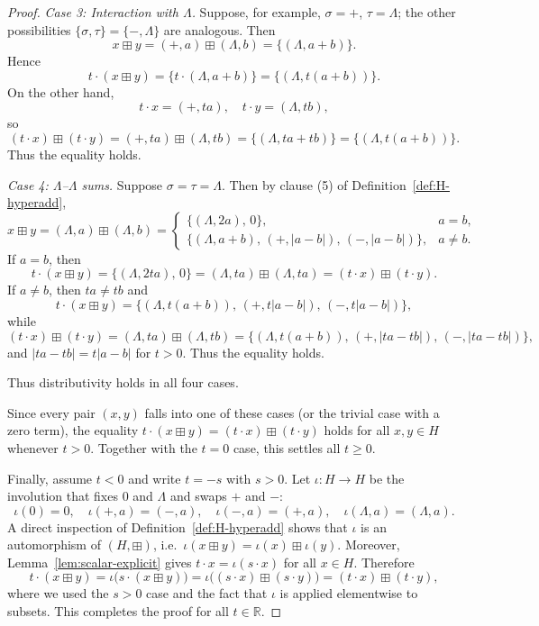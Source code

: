 \documentclass[10pt,a4paper]{amsart}
\newcommand{\Hnum}{H}                      %
\newcommand{\R}{\mathbb{R}}
\newcommand{\op}{\boxplus}                 %
\begin{document}
\begin{proof}
\smallskip\noindent
\emph{Case 3: Interaction with $\Lambda$.}  Suppose, for example,
$\sigma=+$, $\tau=\Lambda$; the other possibilities
$\{\sigma,\tau\}=\{-,\Lambda\}$ are analogous.  Then
\[
  x\op y
  = (+,a)\op(\Lambda,b)
  = \{(\Lambda,a+b)\}.
\]
Hence
\[
  t\cdot(x\op y)
  = \{t\cdot(\Lambda,a+b)\}
  = \{(\Lambda,t(a+b))\}.
\]
On the other hand,
\[
  t\cdot x = (+,ta),\quad
  t\cdot y = (\Lambda,tb),
\]
so
\[
  (t\cdot x)\op(t\cdot y)
  = (+,ta)\op(\Lambda,tb)
  = \{(\Lambda,ta+tb)\}
  = \{(\Lambda,t(a+b))\}.
\]
Thus the equality holds.

\smallskip\noindent
\smallskip\noindent
\emph{Case 4: $\Lambda$--$\Lambda$ sums.}  Suppose $\sigma=\tau=\Lambda$.
Then by clause (5) of Definition~\ref{def:H-hyperadd},
\[
  x\op y
  = (\Lambda,a)\op(\Lambda,b)
  =
  \begin{cases}
    \{(\Lambda,2a),\,0\}, & a=b,\\[2pt]
    \{(\Lambda,a+b),\, (+,|a-b|),\, (-,|a-b|)\}, & a\ne b.
  \end{cases}
\]
If $a=b$, then
\[
  t\cdot(x\op y)
  = \{(\Lambda,2ta),\,0\}
  = (\Lambda,ta)\op(\Lambda,ta)
  = (t\cdot x)\op(t\cdot y).
\]
If $a\ne b$, then $ta\ne tb$ and
\[
  t\cdot(x\op y)
  = \{(\Lambda,t(a+b)),\, (+,t|a-b|),\, (-,t|a-b|)\},
\]
while
\[
  (t\cdot x)\op(t\cdot y)
  = (\Lambda,ta)\op(\Lambda,tb)
  = \{(\Lambda,t(a+b)),\, (+,|ta-tb|),\, (-,|ta-tb|)\},
\]
and $|ta-tb|=t|a-b|$ for $t>0$.  Thus the equality holds.

Thus distributivity holds in all four cases.

Since every pair $(x,y)$ falls into one of these cases (or the trivial
case with a zero term), the equality
$t\cdot(x\op y)=(t\cdot x)\op(t\cdot y)$ holds for all $x,y\in\Hnum$
whenever $t>0$.  Together with the $t=0$ case, this settles all $t\ge0$.

Finally, assume $t<0$ and write $t=-s$ with $s>0$.  Let
$\iota:\Hnum\to\Hnum$ be the involution that fixes $0$ and $\Lambda$ and
swaps $+$ and $-$:
\[
  \iota(0)=0,\quad \iota(+,a)=(-,a),\quad \iota(-,a)=(+,a),\quad \iota(\Lambda,a)=(\Lambda,a).
\]
A direct inspection of Definition~\ref{def:H-hyperadd} shows that $\iota$
is an automorphism of $(\Hnum,\op)$, i.e.\ $\iota(x\op y)=\iota(x)\op\iota(y)$.
Moreover, Lemma~\ref{lem:scalar-explicit} gives $t\cdot x=\iota(s\cdot x)$ for all
$x\in\Hnum$.  Therefore
\[
  t\cdot(x\op y)=\iota\bigl(s\cdot(x\op y)\bigr)
  =\iota\bigl((s\cdot x)\op(s\cdot y)\bigr)
  =(t\cdot x)\op(t\cdot y),
\]
where we used the $s>0$ case and the fact that $\iota$ is applied elementwise
to subsets.  This completes the proof for all $t\in\R$.
\end{proof}
\end{document}
